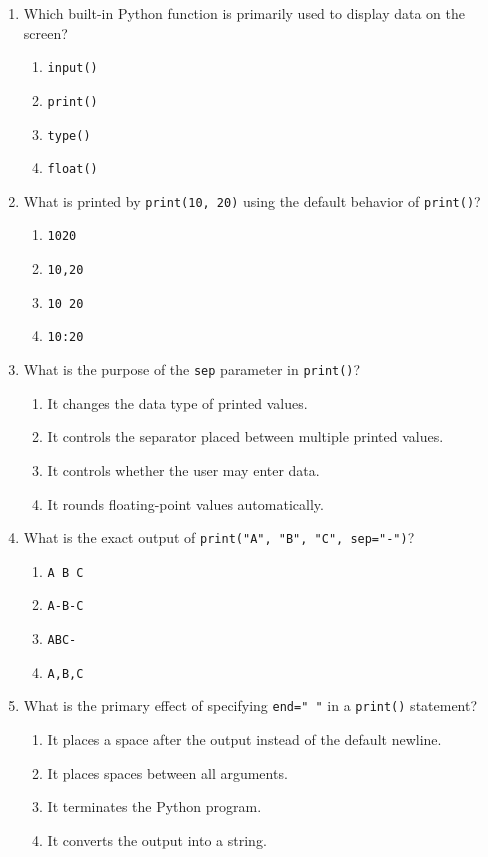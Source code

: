 \documentclass[11pt,a4paper]{article}
\begin{document}
\begin{enumerate}[label=\textbf{Q\arabic*.},leftmargin=2em,itemsep=2pt,topsep=1pt]

\item Which built-in Python function is primarily used to display data on the screen?
\begin{enumerate}[label=\Alph*.,leftmargin=2em]
  \item \texttt{input()}
  \item \texttt{print()}
  \item \texttt{type()}
  \item \texttt{float()}
\end{enumerate}

\item What is printed by \texttt{print(10, 20)} using the default behavior of \texttt{print()}?
\begin{enumerate}[label=\Alph*.,leftmargin=2em]
  \item \texttt{1020}
  \item \texttt{10,20}
  \item \texttt{10 20}
  \item \texttt{10:20}
\end{enumerate}

\item What is the purpose of the \texttt{sep} parameter in \texttt{print()}?
\begin{enumerate}[label=\Alph*.,leftmargin=2em]
  \item It changes the data type of printed values.
  \item It controls the separator placed between multiple printed values.
  \item It controls whether the user may enter data.
  \item It rounds floating-point values automatically.
\end{enumerate}

\item What is the exact output of \texttt{print("A", "B", "C", sep="-")}?
\begin{enumerate}[label=\Alph*.,leftmargin=2em]
  \item \texttt{A B C}
  \item \texttt{A-B-C}
  \item \texttt{ABC-}
  \item \texttt{A,B,C}
\end{enumerate}

\item What is the primary effect of specifying \texttt{end=" "} in a \texttt{print()} statement?
\begin{enumerate}[label=\Alph*.,leftmargin=2em]
  \item It places a space after the output instead of the default newline.
  \item It places spaces between all arguments.
  \item It terminates the Python program.
  \item It converts the output into a string.
\end{enumerate}


\end{enumerate}
\end{document}
